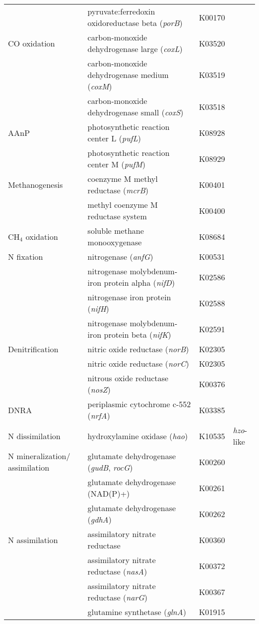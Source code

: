 \begin{longtable}{p{2.7cm}p{7.5cm}p{1cm}p{1.8cm}}
 & pyruvate:ferredoxin oxidoreductase beta (\emph{porB}) & K00170 &  \\
CO oxidation & carbon-monoxide dehydrogenase large (\emph{coxL}) & K03520 &  \\
 & carbon-monoxide dehydrogenase medium (\emph{coxM}) & K03519 &  \\
 & carbon-monoxide dehydrogenase small (\emph{coxS}) & K03518 &  \\
AAnP & photosynthetic reaction center L (\emph{pufL}) & K08928 &  \\
 & photosynthetic reaction center M (\emph{pufM}) & K08929 &  \\
Methanogenesis & coenzyme M methyl reductase (\emph{mcrB}) & K00401 &  \\
 & methyl coenzyme M reductase system & K00400 &  \\
CH$_4$ oxidation & soluble methane monooxygenase & K08684 &  \\
N fixation & nitrogenase (\emph{anfG}) & K00531 &  \\
 & nitrogenase molybdenum-iron protein alpha (\emph{nifD}) & K02586 &  \\
 & nitrogenase iron protein (\emph{nifH}) & K02588 &  \\
 & nitrogenase  molybdenum-iron protein beta (\emph{nifK}) & K02591 &  \\
Denitrification & nitric oxide reductase (\emph{norB}) & K02305 &  \\
 & nitric oxide reductase (\emph{norC}) & K02305 &  \\
 & nitrous oxide reductase (\emph{nosZ}) & K00376 &  \\
DNRA & periplasmic cytochrome c-552 (\emph{nrfA}) & K03385 &  \\
N dissimilation & hydroxylamine oxidase (\emph{hao}) & K10535 & \emph{hzo}-like \\
N mineralization/ assimilation & glutamate dehydrogenase (\emph{gudB}, \emph{rocG}) & K00260 &  \\
 & glutamate dehydrogenase (NAD(P)+) & K00261 &  \\
 & glutamate dehydrogenase (\emph{gdhA}) & K00262 &  \\
N assimilation & assimilatory nitrate reductase & K00360 &  \\
 & assimilatory nitrate reductase (\emph{nasA}) & K00372 &  \\
 & assimilatory nitrate reductase (\emph{narG}) & K00367 &  \\
 & glutamine synthetase (\emph{glnA}) & K01915 &  \\

\end{longtable}
